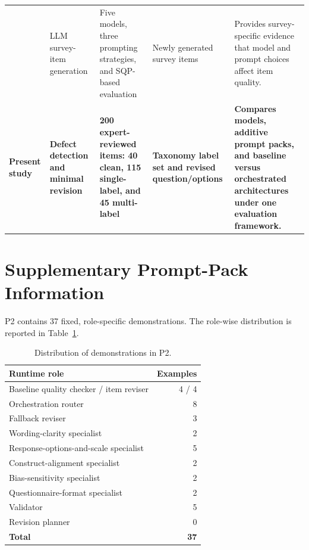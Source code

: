 \documentclass[11pt,a4paper]{article}
\begin{document}
\begin{table}[H]
\begin{tabularx}{\textwidth}{
    p{}
    p{}
    p{}
    p{}
    X
}
\citet{fuchs2026ai}
& LLM survey-item generation
& Five models, three prompting strategies, and SQP-based evaluation
& Newly generated survey items
& Provides survey-specific evidence that model and prompt choices affect item
  quality. \\

\textbf{Present study}
& \textbf{Defect detection and minimal revision}
& \textbf{200 expert-reviewed items: 40 clean, 115 single-label, and 45
  multi-label}
& \textbf{Taxonomy label set and revised question/options}
& \textbf{Compares models, additive prompt packs, and baseline versus
  orchestrated architectures under one evaluation framework.} \\

\bottomrule
\end{tabularx}
\end{table}

\clearpage
\section{Supplementary Prompt-Pack Information}
\label{app:prompt-packs}

P2 contains 37 fixed, role-specific demonstrations. The role-wise distribution
is reported in Table~\ref{tab:p2-examples}.

\begin{table}[H]
\centering
\caption{Distribution of demonstrations in P2.}
\label{tab:p2-examples}
\small
\begin{tabularx}{0.90\textwidth}{Xr}
\toprule
\textbf{Runtime role} & \textbf{Examples}\\
\midrule
Baseline quality checker / item reviser & 4 / 4\\
Orchestration router & 8\\
Fallback reviser & 3\\
Wording-clarity specialist & 2\\
Response-options-and-scale specialist & 5\\
Construct-alignment specialist & 2\\
Bias-sensitivity specialist & 2\\
Questionnaire-format specialist & 2\\
Validator & 5\\
Revision planner & 0\\
\midrule
\textbf{Total} & \textbf{37}\\
\bottomrule
\end{tabularx}
\end{table}
\end{document}
